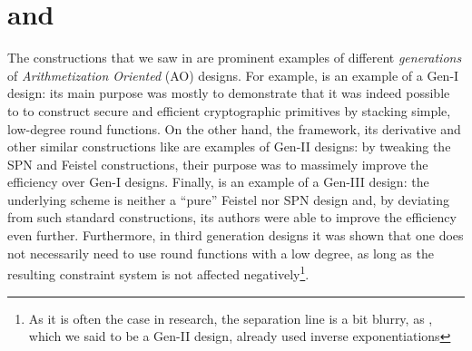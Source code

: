 \section{\Arion{} and \ArionHash{}}\label{sec:gtds}
The constructions that we saw in  are prominent examples of different 
\emph{generations} of \emph{Arithmetization Oriented} (AO) designs.
For example, \Mimc{} is an example of a Gen-I design: its main purpose was mostly to demonstrate 
that it was indeed possible to to construct secure and efficient cryptographic primitives by 
stacking simple, low-degree round functions.
On the other hand, the \Hades{} framework, its derivative \Poseidon{} and other similar 
constructions like \Rescue{} are examples of Gen-II designs: by tweaking the SPN and 
Feistel constructions, their purpose was to massimely improve the efficiency over Gen-I designs.
Finally, \Griffin{} is an example of a Gen-III design: the underlying \Horst{} scheme is neither 
a ``pure'' Feistel nor SPN design and, by deviating from such standard constructions, its authors 
were able to improve the efficiency even further. 
Furthermore, in third generation designs it was shown that one does not necessarily need to use 
round functions with a low degree, as long as the resulting constraint system is not affected 
negatively\footnote{As it is often the case in research, the separation line is a bit blurry, 
as \Rescue, which we said to be a Gen-II design, already used inverse exponentiations}.


